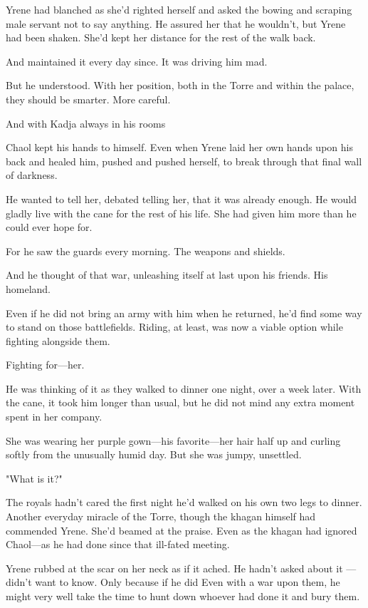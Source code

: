 Yrene had blanched as she'd righted herself and asked the bowing and scraping male servant not to say anything. He assured her that he wouldn't, but Yrene had been shaken. She'd kept her distance for the rest of the walk back.

And maintained it every day since. It was driving him mad.

But he understood. With her position, both in the Torre and within the palace, they should be smarter. More careful.

And with Kadja always in his rooms 

Chaol kept his hands to himself. Even when Yrene laid her own hands upon his back and healed him, pushed and pushed herself, to break through that final wall of darkness.

He wanted to tell her, debated telling her, that it was already enough. He would gladly live with the cane for the rest of his life. She had given him more than he could ever hope for.

For he saw the guards every morning. The weapons and shields.

And he thought of that war, unleashing itself at last upon his friends. His homeland.

Even if he did not bring an army with him when he returned, he'd find some way to stand on those battlefields. Riding, at least, was now a viable option while fighting alongside them.

Fighting for---her.

He was thinking of it as they walked to dinner one night, over a week later. With the cane, it took him longer than usual, but he did not mind any extra moment spent in her company.

She was wearing her purple gown---his favorite---her hair half up and curling softly from the unusually humid day. But she was jumpy, unsettled.

"What is it?"

The royals hadn't cared the first night he'd walked on his own two legs to dinner. Another everyday miracle of the Torre, though the khagan himself had commended Yrene. She'd beamed at the praise. Even as the khagan had ignored Chaol---as he had done since that ill-fated meeting.

Yrene rubbed at the scar on her neck as if it ached. He hadn't asked about it ---didn't want to know. Only because if he did  Even with a war upon them, he might very well take the time to hunt down whoever had done it and bury them.

